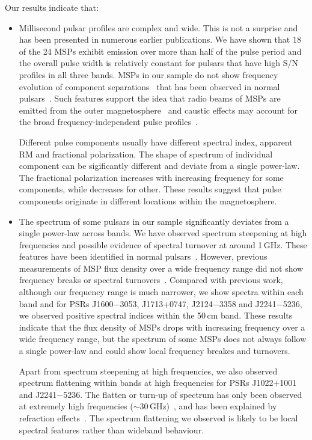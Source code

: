 \documentclass[useAMS,usenatbib]{mn2e}
\begin{document}
Our results indicate that:
\begin{itemize}
\item Millisecond pulsar profiles are complex and wide. This is not a surprise and has been presented 
	in numerous earlier publications. We have shown that 18 of the 24 MSPs exhibit emission 
	over more than half of the pulse period and the overall pulse width is relatively constant for 
	pulsars that have high S/N profiles in all three bands. MSPs in our sample do not show frequency
	evolution of component separations~\citep{Kramer99} that has been observed in normal pulsars~\citep[e.g.,][]{Cordes78,Thorsett91}.
	Such features support the idea that radio beams of MSPs are emitted from the outer magnetosphere~\citep{Manchester05,Ravi10} 
	and caustic effects may account for the broad frequency-independent pulse profiles~\citep{Dyks03,Watters09}.

	Different pulse components usually have different spectral index, apparent RM and fractional 
	polarization. The shape of spectrum of individual component can be sigificantly different and 
	deviate from a single power-law. The fractional polarization increases with increasing frequency 
	for some components, while decreases for other. These results suggest that pulse components 
	originate in different locations within the magnetosphere. 

\item The spectrum of some pulsars in our sample significantly deviates from a single power-law across 
	bands. We have observed spectrum steepening at high frequencies and possible evidence of spectral 
	turnover at around 1\,GHz. These features have been identified in normal pulsars~\citep[e.g.,][]{Maron00,Kijak11}.  
	However, previous measurements of MSP flux density over a wide frequency range did not show frequency 
	breaks or spectral turnovers~\citep{Kramer99,Kuzmin01}. Compared with previous work, although our 
	frequency	range is much narrower, we show spectra within each band and for PSRs J1600$-$3053, J1713$+$0747, 
	J2124$-$3358 and J2241$-$5236, we observed positive spectral indices within the 50\,cm band.
	These results indicate that the flux density of MSPs drops with increasing frequency over a wide 
	frequency range, but the spectrum of some MSPs does not always follow a single power-law and could 
	show local frequency breakes and turnovers.
	
	Apart from spectrum steepening at high frequencies, we also observed spectrum flattening within 
	bands at high frequencies for PSRs J1022$+$1001 and J2241$-$5236. The flatten or turn-up of spectrum 
	has only been observed at extremely high frequencies ($\sim30$\,GHz)~\citep{Kramer96}, and has been 
	explained by refraction effects~\citep{Petrova02}. The spectrum flattening we observed is likely to 
	be local spectral features rather than wideband behaviour.
	

\end{itemize}
\end{document}
